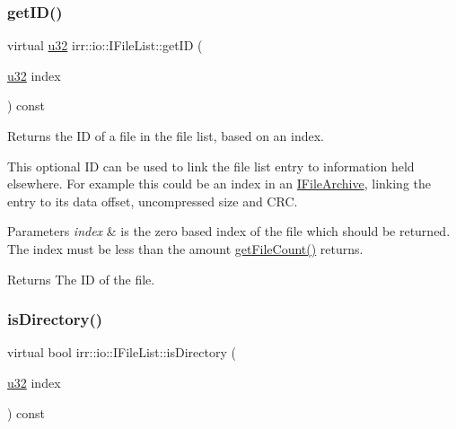 \subsubsection{\texorpdfstring{get\+I\+D()}{getID()}\hspace{0.1cm}{\footnotesize\ttfamily [2/2]}}
{\footnotesize\ttfamily virtual \hyperlink{namespaceirr_a0416a53257075833e7002efd0a18e804}{u32} irr\+::io\+::\+I\+File\+List\+::get\+ID (\begin{DoxyParamCaption}\item[{\hyperlink{namespaceirr_a0416a53257075833e7002efd0a18e804}{u32}}]{index }\end{DoxyParamCaption}) const\hspace{0.3cm}{\ttfamily [pure virtual]}}



Returns the ID of a file in the file list, based on an index. 

This optional ID can be used to link the file list entry to information held elsewhere. For example this could be an index in an \hyperlink{classirr_1_1io_1_1IFileArchive}{I\+File\+Archive}, linking the entry to its data offset, uncompressed size and C\+RC. 
\begin{DoxyParams}{Parameters}
{\em index} & is the zero based index of the file which should be returned. The index must be less than the amount \hyperlink{classirr_1_1io_1_1IFileList_a871861be76e18d58274c4580b1d103b9}{get\+File\+Count()} returns. \\
\hline
\end{DoxyParams}
\begin{DoxyReturn}{Returns}
The ID of the file. 
\end{DoxyReturn}
\mbox{\label{classirr_1_1io_1_1IFileList_a0f2cb8c99e9ecc4b56d08718c885a5af}} 
\subsubsection{\texorpdfstring{is\+Directory()}{isDirectory()}\hspace{0.1cm}{\footnotesize\ttfamily [1/2]}}
{\footnotesize\ttfamily virtual bool irr\+::io\+::\+I\+File\+List\+::is\+Directory (\begin{DoxyParamCaption}\item[{\hyperlink{namespaceirr_a0416a53257075833e7002efd0a18e804}{u32}}]{index }\end{DoxyParamCaption}) const\hspace{0.3cm}{\ttfamily [pure virtual]}}




